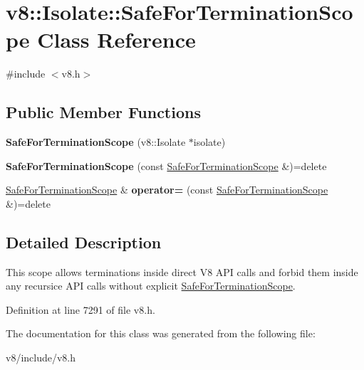 \hypertarget{classv8_1_1Isolate_1_1SafeForTerminationScope}{}\section{v8\+:\+:Isolate\+:\+:Safe\+For\+Termination\+Scope Class Reference}
\label{classv8_1_1Isolate_1_1SafeForTerminationScope}


{\ttfamily \#include $<$v8.\+h$>$}

\subsection*{Public Member Functions}
\begin{DoxyCompactItemize}
\item 
\mbox{\label{classv8_1_1Isolate_1_1SafeForTerminationScope_aa68b3979df8fef65b1e7afa9cd9bba03}} 
{\bfseries Safe\+For\+Termination\+Scope} (v8\+::\+Isolate $\ast$isolate)
\item 
\mbox{\label{classv8_1_1Isolate_1_1SafeForTerminationScope_aa7041e87a889e8d4d8cdbca6b5adfa0d}} 
{\bfseries Safe\+For\+Termination\+Scope} (const \mbox{\hyperlink{classv8_1_1Isolate_1_1SafeForTerminationScope}{Safe\+For\+Termination\+Scope}} \&)=delete
\item 
\mbox{\label{classv8_1_1Isolate_1_1SafeForTerminationScope_ab4425468e50b70e5f0b8a7f438e609fa}} 
\mbox{\hyperlink{classv8_1_1Isolate_1_1SafeForTerminationScope}{Safe\+For\+Termination\+Scope}} \& {\bfseries operator=} (const \mbox{\hyperlink{classv8_1_1Isolate_1_1SafeForTerminationScope}{Safe\+For\+Termination\+Scope}} \&)=delete
\end{DoxyCompactItemize}


\subsection{Detailed Description}
This scope allows terminations inside direct V8 A\+PI calls and forbid them inside any recursice A\+PI calls without explicit \mbox{\hyperlink{classv8_1_1Isolate_1_1SafeForTerminationScope}{Safe\+For\+Termination\+Scope}}. 

Definition at line 7291 of file v8.\+h.



The documentation for this class was generated from the following file\+:\begin{DoxyCompactItemize}
\item 
v8/include/v8.\+h\end{DoxyCompactItemize}
